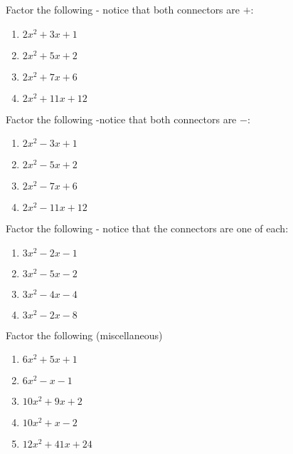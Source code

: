 \begin{myexample}
\drillandskill
Factor the following - notice that both connectors are $+$:
\begin{multicols}{2}
	\begin{enumerate}
		\item $2x^2+3x+1$
		\item $2x^2+5x+2$
		\item $2x^2+7x+6$
		\item $2x^2+11x+12$
	\end{enumerate}
\end{multicols}

Factor the following -notice that both connectors are $-$:
\begin{multicols}{2}
	\begin{enumerate}
		\item $2x^2-3x+1$
		\item $2x^2-5x+2$
		\item $2x^2-7x+6$
		\item $2x^2-11x+12$
	\end{enumerate}
\end{multicols}

Factor the following - notice that the connectors are one of each:
\begin{multicols}{2}
	\begin{enumerate}
		\item $3x^2-2x-1$
		\item $3x^2-5x-2$
		\item $3x^2-4x-4$
		\item $3x^2-2x-8$
	\end{enumerate}
\end{multicols}

Factor the following (miscellaneous)
\begin{multicols}{2}
	\begin{enumerate}
		\item $6x^2+5x+1$
		\item $6x^2-x-1$
		\item $10x^2+9x+2$
		\item $10x^2+x-2$
		\item $12x^2+41x+24$
	\end{enumerate}
\end{multicols}


\end{myexample}
